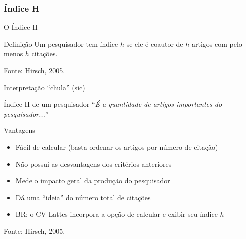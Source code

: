 \documentclass{beamer}
\begin{document}
\subsubsection{Índice H}

\begin{frame}{O Índice H}
  \begin{block}{Definição}
    Um pesquisador tem índice $h$ se ele é coautor de $h$ artigos com \alert{pelo menos} $h$ citações.
  \end{block}



\vfill
Fonte: Hirsch, 2005.
\end{frame}

\begin{frame}{Interpretação ``chula'' (sic)}
  \begin{block}{Índice H de um pesquisador}
    ``{\em É a quantidade de artigos importantes do pesquisador...}''
  \end{block}
\end{frame}

\begin{frame}{Vantagens}
  \begin{itemize}
  \item Fácil de calcular (basta ordenar os artigos por número de citação)
  \item Não possui as desvantagens dos critérios anteriores
  \item Mede o impacto geral da produção do pesquisador
  \item Dá uma ``ideia'' do número total de citações
  \item BR: o CV Lattes incorpora a opção de calcular e exibir seu índice $h$
  \end{itemize}

\vfill
Fonte: Hirsch, 2005.
\end{frame}

\end{document}
